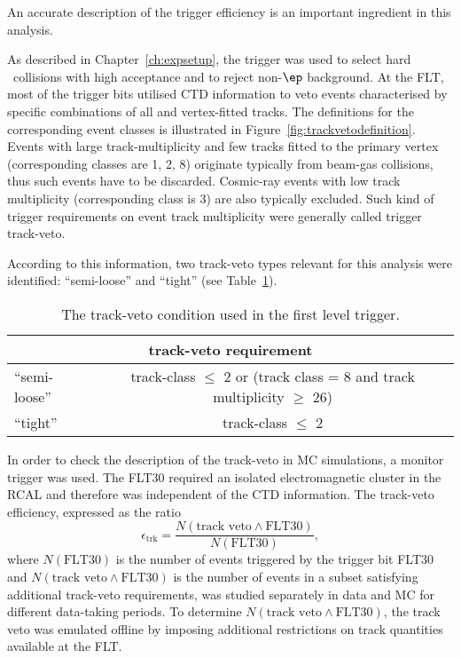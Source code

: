 An accurate description of the trigger efficiency is an important ingredient in this analysis.

As described in Chapter~\ref{ch:expsetup}, the \zeus trigger was used to select hard \ep~collisions with high acceptance and to reject non-$\ep$ background. At the FLT, most of the trigger bits utilised CTD information to veto events characterised by specific combinations of all and vertex-fitted tracks. The definitions for the corresponding event classes is illustrated in Figure~\ref{fig:trackvetodefinition}. Events with large track-multiplicity and few tracks fitted to the primary vertex (corresponding classes are 1, 2, 8) originate typically from beam-gas collisions, thus such events have to be discarded. Cosmic-ray events with low track multiplicity (corresponding class is 3) are also typically excluded. Such kind of trigger requirements on event track multiplicity were generally called trigger track-veto.

 According to this information, two track-veto types relevant for this analysis were identified: ``semi-loose'' and ``tight'' (see Table~\ref{tab:trackveto}). 
\textcolor{blue}{
\begin{table}[htpb]
 \centering
 \begin{tabular}{lc}
 \multicolumn{2}{c}{track-veto requirement} \\
  \hline
 ``semi-loose'' & track-class $\le$ 2 or (track class = 8 and track multiplicity $\ge$ 26) \\
 ``tight''      & track-class $\le$ 2 \\
 \end{tabular} 
\caption{The track-veto condition used in the first level trigger.}
\label{tab:trackveto}
\end{table} 
}
In order to check the description of the track-veto in MC simulations, a monitor trigger was used. The FLT30 required an isolated electromagnetic cluster in the RCAL and therefore was independent of the CTD information. The track-veto efficiency, expressed as the ratio
\begin{equation}
 \epsilon_\mathrm{trk} = \frac{N\left(\text{track veto} \wedge \text{FLT30}\right)}{N\left(\text{FLT30}\right)},
\end{equation}
where $N\left(\text{FLT30}\right)$ is the number of events triggered by the trigger bit FLT30 and $N\left(\text{track veto} \wedge \text{FLT30}\right)$ is the number of events in a subset satisfying additional track-veto requirements, was studied separately in data and MC for different data-taking periods. To determine $N\left(\text{track veto} \wedge \text{FLT30}\right)$, the track veto was emulated offline by imposing additional restrictions on track quantities available at the FLT.

